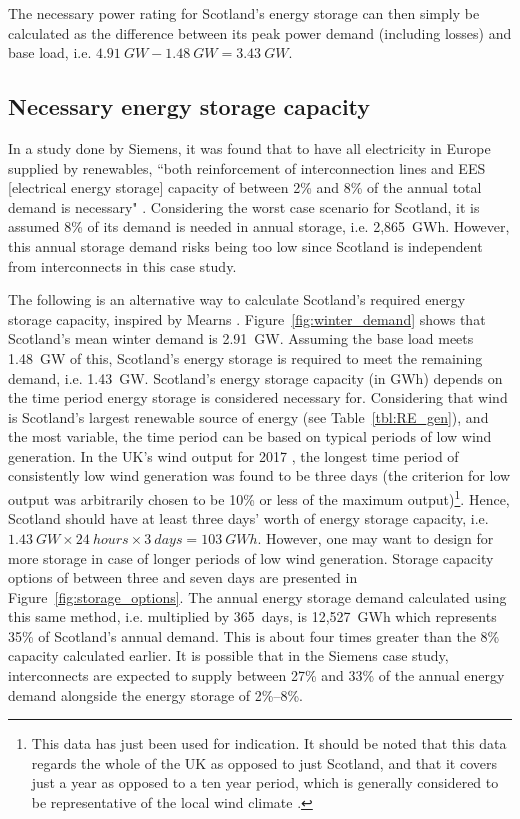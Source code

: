 The necessary power rating for Scotland's energy storage can then simply be calculated as the difference between its peak power demand (including losses) and base load, i.e. $4.91~GW - 1.48~GW = 3.43~GW$.




\subsection{Necessary energy storage capacity}

In a study done by Siemens, it was found that to have all electricity in Europe supplied by renewables, ``both reinforcement of interconnection lines and EES [electrical energy storage] capacity of between 2\% and 8\% of the annual total demand is necessary" \citep[p.~69]{IEC2011}.
Considering the worst case scenario for Scotland, it is assumed 8\% of its demand is needed in annual storage, i.e. 2,865~GWh.
However, this annual storage demand risks being too low since Scotland is independent from interconnects in this case study.

The following is an alternative way to calculate Scotland's required energy storage capacity, inspired by Mearns \citep{Mearns2018}.
Figure~\ref{fig:winter_demand} shows that Scotland's mean winter demand is 2.91~GW.
Assuming the base load meets 1.48~GW of this, Scotland's energy storage is required to meet the remaining demand, i.e. 1.43~GW.
Scotland's energy storage capacity (in GWh) depends on the time period energy storage is considered necessary for.
Considering that wind is Scotland's largest renewable source of energy (see Table~\ref{tbl:RE_gen}), and the most variable, the time period can be based on typical periods of low wind generation.
In the UK's wind output for 2017 \citep{GridWatchnd}, the longest time period of consistently low wind generation was found to be three days (the criterion for low output was arbitrarily chosen to be 10\% or less of the maximum output)\footnote{This data has just been used for indication. It should be noted that this data regards the whole of the UK as opposed to just Scotland, and that it covers just a year as opposed to a ten year period, which is generally considered to be representative of the local wind climate \citep[p.~15]{Boehme2006}.}.
Hence, Scotland should have at least three days' worth of energy storage capacity, i.e. $1.43~GW \times 24~hours \times 3~days = 103~GWh$.
However, one may want to design for more storage in case of longer periods of low wind generation.
Storage capacity options of between three and seven days are presented in Figure~\ref{fig:storage_options}.
The annual energy storage demand calculated using this same method, i.e. multiplied by 365~days, is 12,527~GWh which represents 35\% of Scotland's annual demand.
This is about four times greater than the 8\% capacity calculated earlier.
It is possible that in the Siemens case study, interconnects are expected to supply between 27\% and 33\% of the annual energy demand alongside the energy storage of 2\%--8\%.

